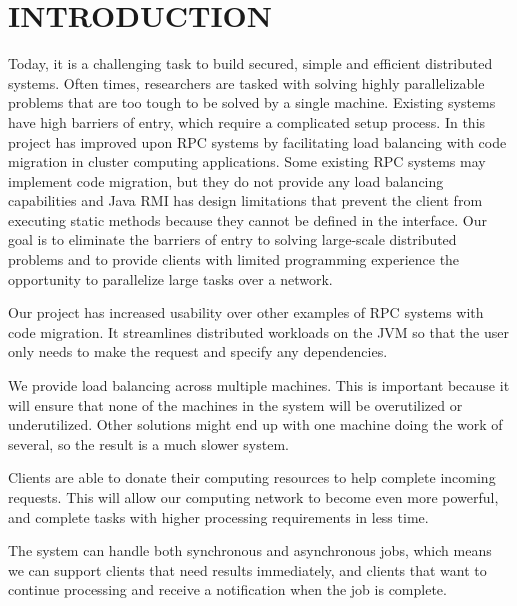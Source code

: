 \section{INTRODUCTION}\label{sec:introduction}


Today, it is a challenging task to build secured, simple and efficient distributed
systems. Often times, researchers are tasked with solving highly parallelizable problems
that are too tough to be solved by a single machine. Existing systems have
high barriers of entry, which require a complicated setup process. In this project has improved upon RPC systems by facilitating load balancing with code
migration in cluster computing applications. Some existing RPC systems may implement
code migration, but they do not provide any load balancing capabilities
and Java RMI has design limitations that prevent the client from executing static
methods because they cannot be defined in the interface. Our goal is to eliminate
the barriers of entry to solving large-scale distributed problems and to provide
clients with limited programming experience the opportunity to parallelize large
tasks over a network.

Our project has increased usability over other examples of RPC systems with code migration. It streamlines distributed workloads on the JVM so that the user only needs to make the request and specify any dependencies.

We provide load balancing across multiple machines. This is important because it will ensure that none of the machines in the system will be overutilized or underutilized. Other solutions might end up with one machine doing the work of several, so the result is a much slower system.

Clients are able to donate their computing resources to help complete incoming requests. This will allow our computing network to become even more powerful, and complete tasks with higher processing requirements in less time.

The system can handle both synchronous and asynchronous jobs, which means we can support clients that need results immediately, and clients that want to continue processing and receive a notification when the job is complete.